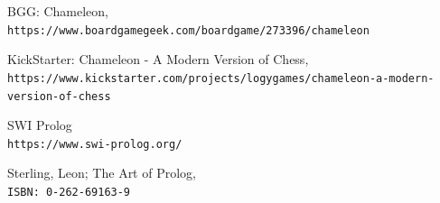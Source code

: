 \documentclass[a4paper]{article}
\begin{document}
\vspace{15pt}

\begin{thebibliography}{9}

BGG: Chameleon,
\\\texttt{https://www.boardgamegeek.com/boardgame/273396/chameleon}
 
KickStarter: Chameleon - A Modern Version of Chess,
\\\texttt{https://www.kickstarter.com/projects/logygames/chameleon-\newline a-modern-version-of-chess}

SWI Prolog
\\\texttt{https://www.swi-prolog.org/}

Sterling, Leon; The Art of Prolog,
\\\texttt{ISBN: 0-262-69163-9}

\end{thebibliography}
\end{document}
